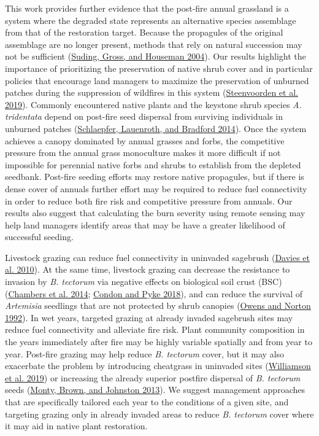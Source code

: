 \documentclass[
  12pt,
]{article}
\begin{document}
This work provides further evidence that the post-fire annual grassland
is a system where the degraded state represents an alternative species
assemblage from that of the restoration target. Because the propagules
of the original assemblage are no longer present, methods that rely on
natural succession may not be sufficient
(\protect\hyperlink{ref-Suding2004}{Suding, Gross, and Houseman 2004}).
Our results highlight the importance of prioritizing the preservation of
native shrub cover and in particular policies that encourage land
managers to maximize the preservation of unburned patches during the
suppression of wildfires in this system
(\protect\hyperlink{ref-Steenvoorden2019}{Steenvoorden et al. 2019}).
Commonly encountered native plants and the keystone shrub species
\emph{A. tridentata} depend on post-fire seed dispersal from surviving
individuals in unburned patches
(\protect\hyperlink{ref-Schlaepfer2014}{Schlaepfer, Lauenroth, and
Bradford 2014}). Once the system achieves a canopy dominated by annual
grasses and forbs, the competitive pressure from the annual grass
monoculture makes it more difficult if not impossible for perennial
native forbs and shrubs to establish from the depleted seedbank.
Post-fire seeding efforts may restore native propagules, but if there is
dense cover of annuals further effort may be required to reduce fuel
connectivity in order to reduce both fire risk and competitive pressure
from annuals. Our results also suggest that calculating the burn
severity using remote sensing may help land managers identify areas that
may be have a greater likelihood of successful seeding.

Livestock grazing can reduce fuel connectivity in uninvaded sagebrush
(\protect\hyperlink{ref-Davies2010}{Davies et al. 2010}). At the same
time, livestock grazing can decrease the resistance to invasion by
\emph{B. tectorum} via negative effects on biological soil crust (BSC)
(\protect\hyperlink{ref-chambers_resilience_2014}{Chambers et al. 2014};
\protect\hyperlink{ref-Condon2018}{Condon and Pyke 2018}), and can
reduce the survival of \emph{Artemisia} seedlings that are not protected
by shrub canopies (\protect\hyperlink{ref-Owens1992}{Owens and Norton
1992}). In wet years, targeted grazing at already invaded sagebrush
sites may reduce fuel connectivity and alleviate fire risk. Plant
community composition in the years immediately after fire may be highly
variable spatially and from year to year. Post-fire grazing may help
reduce \emph{B. tectorum} cover, but it may also exacerbate the problem
by introducing cheatgrass in uninvaded sites
(\protect\hyperlink{ref-Williamson2019}{Williamson et al. 2019}) or
increasing the already superior postfire dispersal of \emph{B. tectorum}
seeds (\protect\hyperlink{ref-Monty2013}{Monty, Brown, and Johnston
2013}). We suggest management approaches that are specifically tailored
each year to the conditions of a given site, and targeting grazing only
in already invaded areas to reduce \emph{B. tectorum} cover where it may
aid in native plant restoration.
\end{document}
